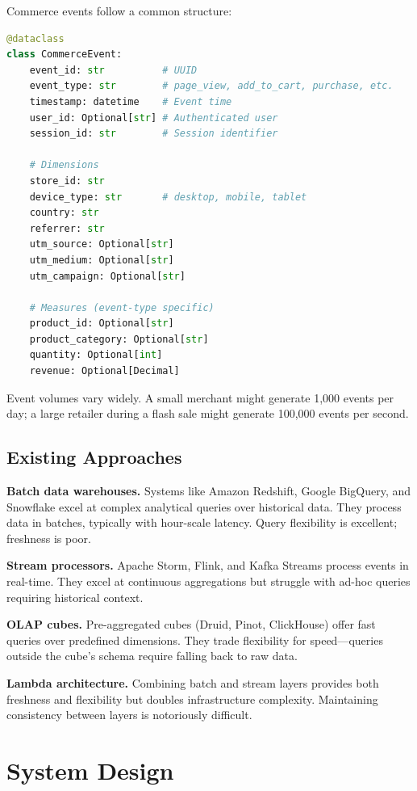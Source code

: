 \documentclass[11pt,twocolumn]{article}
\begin{document}
Commerce events follow a common structure:

\begin{lstlisting}[language=Python,caption=Event schema]
@dataclass
class CommerceEvent:
    event_id: str          # UUID
    event_type: str        # page_view, add_to_cart, purchase, etc.
    timestamp: datetime    # Event time
    user_id: Optional[str] # Authenticated user
    session_id: str        # Session identifier

    # Dimensions
    store_id: str
    device_type: str       # desktop, mobile, tablet
    country: str
    referrer: str
    utm_source: Optional[str]
    utm_medium: Optional[str]
    utm_campaign: Optional[str]

    # Measures (event-type specific)
    product_id: Optional[str]
    product_category: Optional[str]
    quantity: Optional[int]
    revenue: Optional[Decimal]
\end{lstlisting}

Event volumes vary widely. A small merchant might generate 1,000 events per day; a large retailer during a flash sale might generate 100,000 events per second.

\subsection{Existing Approaches}

\textbf{Batch data warehouses.} Systems like Amazon Redshift, Google BigQuery, and Snowflake excel at complex analytical queries over historical data. They process data in batches, typically with hour-scale latency. Query flexibility is excellent; freshness is poor.

\textbf{Stream processors.} Apache Storm, Flink, and Kafka Streams process events in real-time. They excel at continuous aggregations but struggle with ad-hoc queries requiring historical context.

\textbf{OLAP cubes.} Pre-aggregated cubes (Druid, Pinot, ClickHouse) offer fast queries over predefined dimensions. They trade flexibility for speed—queries outside the cube's schema require falling back to raw data.

\textbf{Lambda architecture.} Combining batch and stream layers provides both freshness and flexibility but doubles infrastructure complexity. Maintaining consistency between layers is notoriously difficult.

\section{System Design}
\end{document}
